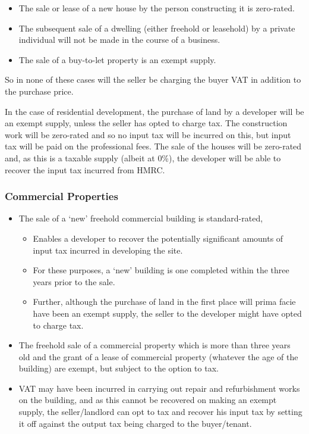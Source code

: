 \documentclass[
]{article}
\providecommand{\tightlist}{%
  \setlength{\itemsep}{0pt}\setlength{\parskip}{0pt}}
\begin{document}
\begin{itemize}
\tightlist
\item
  The sale or lease of a new house by the person constructing it is
  zero-rated.
\item
  The subsequent sale of a dwelling (either freehold or leasehold) by a
  private individual will not be made in the course of a business.
\item
  The sale of a buy-to-let property is an exempt supply.
\end{itemize}

So in none of these cases will the seller be charging the buyer VAT in
addition to the purchase price.

In the case of residential development, the purchase of land by a
developer will be an exempt supply, unless the seller has opted to
charge tax. The construction work will be zero-rated and so no input tax
will be incurred on this, but input tax will be paid on the professional
fees. The sale of the houses will be zero-rated and, as this is a
taxable supply (albeit at 0\%), the developer will be able to recover
the input tax incurred from HMRC.

\hypertarget{commercial-properties}{%
\subsubsection{Commercial Properties}\label{commercial-properties}}

\begin{itemize}
\tightlist
\item
  The sale of a `new' freehold commercial building is standard-rated,

  \begin{itemize}
  \tightlist
  \item
    Enables a developer to recover the potentially significant amounts
    of input tax incurred in developing the site.
  \item
    For these purposes, a `new' building is one completed within the
    three years prior to the sale.
  \item
    Further, although the purchase of land in the first place will prima
    facie have been an exempt supply, the seller to the developer might
    have opted to charge tax.
  \end{itemize}
\item
  The freehold sale of a commercial property which is more than three
  years old and the grant of a lease of commercial property (whatever
  the age of the building) are exempt, but subject to the option to tax.
\item
  VAT may have been incurred in carrying out repair and refurbishment
  works on the building, and as this cannot be recovered on making an
  exempt supply, the seller/landlord can opt to tax and recover his
  input tax by setting it off against the output tax being charged to
  the buyer/tenant.
\end{itemize}
\end{document}
